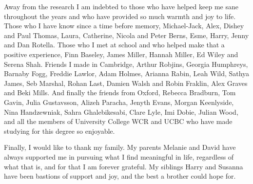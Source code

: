 Away from the research I am indebted to those who have helped keep me sane throughout the years and who have provided so much warmth and joy to life.
Those who I have know since a time before memory, Michael-Jack, Alex, Dishey and Paul Thomas, Laura, Catherine, Nicola and Peter Berns, Esme, Harry, Jenny and Dan Rotella.
Those who I met at school and who helped make that a positive experience, Finn Baseley, James Miller, Hannah Miller, Ed Wiley and Serena Shah.
Friends I made in Cambridge, Arthur Robjins, Georgia Humphreys, Barnaby Fogg, Freddie Lawlor, Adam Holmes, Arianna Rabin, Leah Wild, Sathya James, Seb Marshal, Rohan Last, Damien Walsh and Robin Fraklin, Alex Graves and Beki Mills.
And finally the friends from Oxford, Rebecca Bradburn, Tom Gavin, Julia Gustavsson, Alizeh Paracha, Jenyth Evans, Morgan Keenlyside, Nina Handzewniak, Sahra Ghalebikesabi, Clare Lyle, Imi Dobie, Julian Wood, and all the members of University College WCR and UCBC who have made studying for this degree so enjoyable.

Finally, I would like to thank my family.
My parents Melanie and David have always supported me in pursuing what I find meaningful in life, regardless of what that is, and for that I am forever grateful.
My siblings Harry and Susanna have been bastions of support and joy, and the best a brother could hope for.
